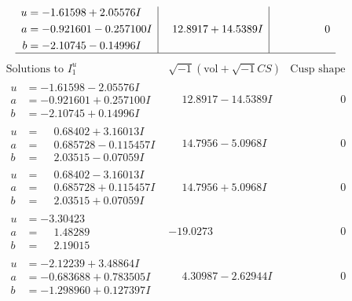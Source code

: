 \documentclass[1p]{elsarticle_modified}
\theoremstyle{definition}
\newcommand{\I}{\sqrt{-1}}
\begin{document}
$$\begin{array}{c|c|c}
\begin{aligned}
u &= -1.61598 + 2.05576 I \\
a &= -0.921601 - 0.257100 I \\
b &= -2.10745 - 0.14996 I\end{aligned}
 & \phantom{-}12.8917 + 14.5389 I & \phantom{-0.000000 } 0\\
 \hline 
 \end{array}$$\newpage$$\begin{array}{c|c|c}  
\text{Solutions to }I^u_{1}& \I (\text{vol} + \sqrt{-1}CS) & \text{Cusp shape}\\
 \hline 
\begin{aligned}
u &= -1.61598 - 2.05576 I \\
a &= -0.921601 + 0.257100 I \\
b &= -2.10745 + 0.14996 I\end{aligned}
 & \phantom{-}12.8917 - 14.5389 I & \phantom{-0.000000 } 0 \\ \hline\begin{aligned}
u &= \phantom{-}0.68402 + 3.16013 I \\
a &= \phantom{-}0.685728 - 0.115457 I \\
b &= \phantom{-}2.03515 - 0.07059 I\end{aligned}
 & \phantom{-}14.7956 - 5.0968 I & \phantom{-0.000000 } 0 \\ \hline\begin{aligned}
u &= \phantom{-}0.68402 - 3.16013 I \\
a &= \phantom{-}0.685728 + 0.115457 I \\
b &= \phantom{-}2.03515 + 0.07059 I\end{aligned}
 & \phantom{-}14.7956 + 5.0968 I & \phantom{-0.000000 } 0 \\ \hline\begin{aligned}
u &= -3.30423\phantom{ +0.000000I} \\
a &= \phantom{-}1.48289\phantom{ +0.000000I} \\
b &= \phantom{-}2.19015\phantom{ +0.000000I}\end{aligned}
 & -19.0273\phantom{ +0.000000I} & \phantom{-0.000000 } 0 \\ \hline\begin{aligned}
u &= -2.12239 + 3.48864 I \\
a &= -0.683688 + 0.783505 I \\
b &= -1.298960 + 0.127397 I\end{aligned}
 & \phantom{-}4.30987 - 2.62944 I & \phantom{-0.000000 } 0 \\ \hline\begin{aligned}

\end{aligned}
\end{array}$$
\end{document}
